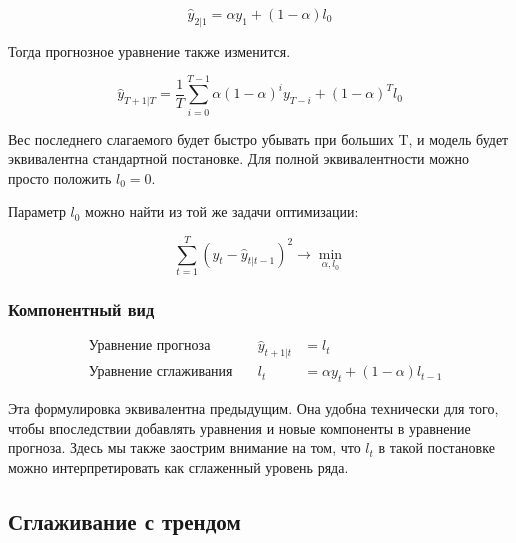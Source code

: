 \documentclass[12pt,fleqn]{article}
\begin{document}
$$
 \hat{y}_{2|1} = \alpha y_1 +(1-\alpha) l_0
$$

Тогда прогнозное уравнение также изменится.

$$
\hat{y}_{T+1|T} = \frac{1}{T}\sum_{i=0}^{T-1} \alpha (1-\alpha)^{i} y_{T-i} + (1-\alpha)^T l_0
$$

Вес последнего слагаемого будет быстро убывать при больших T, и модель будет эквивалентна стандартной постановке. Для полной эквивалентности можно просто положить $l_0 = 0$.

Параметр $l_0$ можно найти из той же задачи оптимизации:

$$
\sum_{t=1}^{T}(y_t - \hat{y}_{t|t-1})^2 \rightarrow \min_{\alpha, l_0}
$$


\subsubsection{Компонентный вид}

\begin{equation}
	\begin{split}
		&\text{Уравнение прогноза} \quad & 	\hat{y}_{t+1|t}& = l_t \\
		&\text{Уравнение сглаживания}\quad & l_t& =\alpha y_t +(1-\alpha) l_{t-1}
	\end{split}
\end{equation}

Эта формулировка эквивалентна предыдущим. Она удобна технически для того, чтобы впоследствии добавлять уравнения и новые компоненты в уравнение прогноза. Здесь мы также заострим внимание на том, что $l_t$ в такой постановке можно интерпретировать как сглаженный уровень ряда.


\subsection{Сглаживание с трендом}



	\begin{thebibliography}{1}
	
	\end{thebibliography}
	
\end{document}

